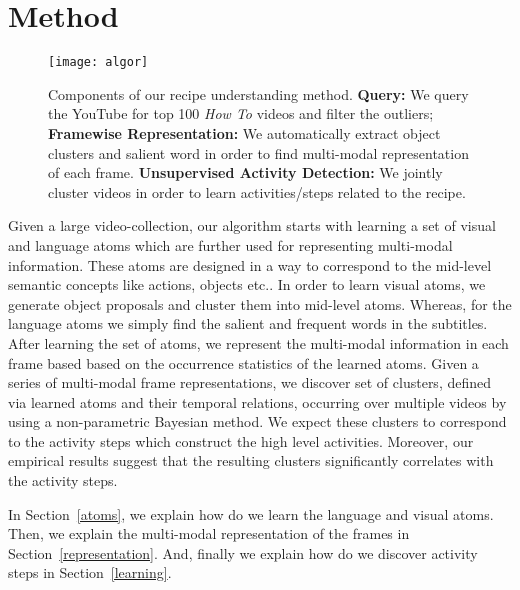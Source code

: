 \section{Method}
\label{sec:overview}
\begin{figure}[h]
  \texttt{[image: algor]}
  \caption{Components of our recipe understanding method. \textbf{Query:} We query the YouTube for top 100 \emph{How To} videos and filter the outliers; \textbf{Framewise Representation:} We automatically extract object clusters and salient word in order to find multi-modal representation of each frame. \textbf{Unsupervised Activity Detection:} We jointly cluster videos in order to learn activities/steps related to the recipe.}
\label{fig:overview}
\end{figure}

Given a large video-collection, our algorithm starts with learning a set of visual and language atoms which are further used for representing multi-modal information. These atoms are designed in a way to correspond to the mid-level semantic concepts like actions, objects etc.. In order to learn visual atoms, we generate object proposals and cluster them into mid-level atoms. Whereas, for the language atoms we simply find the salient and frequent words in the subtitles. After learning the set of atoms, we represent the multi-modal information in each frame based based on the occurrence statistics of the learned atoms. Given a series of multi-modal frame representations, we discover set of clusters, defined via learned atoms and their temporal relations, occurring over multiple videos by using a non-parametric Bayesian method. We expect these clusters to correspond to the activity steps which construct the high level activities. Moreover, our empirical results suggest that the resulting clusters significantly correlates with the activity steps.

In Section~\ref{atoms}, we explain how do we learn the language and visual atoms. Then, we explain the multi-modal representation of the frames in Section~\ref{representation}. And, finally we explain how do we discover activity steps in Section~\ref{learning}.



